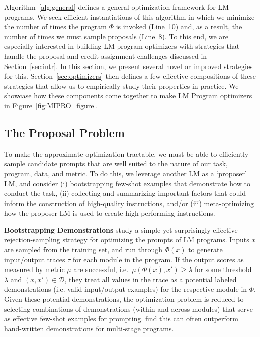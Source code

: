 Algorithm~\ref{alg:general} defines a general optimization framework for LM programs. We seek efficient instantiations of this algorithm in which we minimize the number of times the program $\Phi$ is invoked (Line~10) and, as a result, the number of times we must sample proposals (Line~8). To this end, we are especially interested in building LM program optimizers with strategies that handle the proposal and credit assignment challenges discussed in Section~\ref{sec:intr}. In this section, we present several novel or improved strategies for this. Section~\ref{sec:optimizers} then defines a few effective compositions of these strategies that allow us to empirically study their properties in practice.  We showcase how these components come together to make LM Program optimizers in Figure~\ref{fig:MIPRO_figure}.





\subsection{The Proposal Problem}
\label{sec:prompt_proposal}

To make the approximate optimization tractable, we must be able to efficiently sample candidate prompts that are well suited to the nature of our task, program, data, and metric. To do this, we leverage another LM as a `proposer' LM, and consider (i) bootstrapping few-shot examples that demonstrate how to conduct the task, (ii) collecting and summarizing important factors that could inform the construction of high-quality instructions, and/or (iii) meta-optimizing how the proposer LM is used to create high-performing instructions.




\textbf{Bootstrapping Demonstrations}
\citet{khattab2022demonstrate,khattab2024dspy} study a simple yet surprisingly effective rejection-sampling strategy for optimizing the prompts of LM programs. Inputs $x$ are sampled from the training set, and run through $\Phi(x)$ to generate input/output traces $\tau$ for each module in the program. If the output scores as measured by metric $\mu$ are successful, i.e.\ $\mu(\Phi(x), x') \geq \lambda$ for some threshold $\lambda$ and 
$(x, x') \in \mathcal{D}$, they treat all values in the trace as a potential labeled demonstrations (i.e. valid input/output examples) for the respective module in $\Phi$. 
Given these potential demonstrations, the optimization problem is reduced to selecting combinations of demonstrations (within and across modules) that serve as effective few-shot examples for prompting. \citet{khattab2024dspy} find this can often outperform hand-written demonstrations for multi-stage programs.

